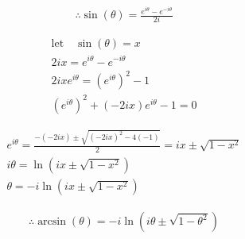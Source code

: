 \documentclass{../../style}
\begin{document}
\euler

\begin{gather*}
	\therefore \sin(\theta) = \frac{e^{i\theta} - e^{-i\theta}}{2i}
\end{gather*}

\begin{gather*}
	\text{let} \quad \sin(\theta) = x \\
	2ix = e^{i\theta} - e^{-i\theta} \\
	2ixe^{i\theta} = (e^{i\theta})^2 - 1 \\ 
	(e^{i\theta})^2 + (-2ix)e^{i\theta} - 1 = 0
\end{gather*}

\begin{gather*}
	e^{i\theta} = \frac{-(-2ix) \pm \sqrt{(-2ix)^2 - 4(-1)}}{2} = ix \pm \sqrt{1 - x^2} \\
	i\theta = \ln(ix \pm \sqrt{1 - x^2}) \\
	\theta = -i\ln(ix \pm \sqrt{1 - x^2})
\end{gather*}

\begin{gather*}
	\therefore \arcsin(\theta) = -i\ln(i\theta \pm \sqrt{1 -\theta^2})
\end{gather*}
\end{document}
